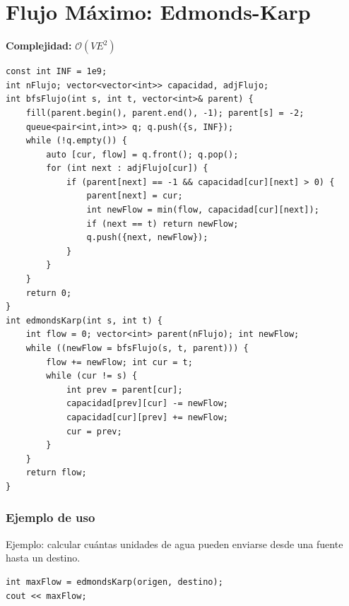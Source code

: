 \documentclass[10pt,twocolumn,letterpaper]{report}
\begin{document}
\section{Flujo Máximo: Edmonds-Karp}
\textbf{Complejidad:} $\mathcal{O}(V E^2)$
\begin{lstlisting}
const int INF = 1e9;
int nFlujo; vector<vector<int>> capacidad, adjFlujo;
int bfsFlujo(int s, int t, vector<int>& parent) {
    fill(parent.begin(), parent.end(), -1); parent[s] = -2;
    queue<pair<int,int>> q; q.push({s, INF});
    while (!q.empty()) {
        auto [cur, flow] = q.front(); q.pop();
        for (int next : adjFlujo[cur]) {
            if (parent[next] == -1 && capacidad[cur][next] > 0) {
                parent[next] = cur;
                int newFlow = min(flow, capacidad[cur][next]);
                if (next == t) return newFlow;
                q.push({next, newFlow});
            }
        }
    }
    return 0;
}
int edmondsKarp(int s, int t) {
    int flow = 0; vector<int> parent(nFlujo); int newFlow;
    while ((newFlow = bfsFlujo(s, t, parent))) {
        flow += newFlow; int cur = t;
        while (cur != s) {
            int prev = parent[cur];
            capacidad[prev][cur] -= newFlow;
            capacidad[cur][prev] += newFlow;
            cur = prev;
        }
    }
    return flow;
}
\end{lstlisting}
\subsubsection*{Ejemplo de uso}
Ejemplo: calcular cuántas unidades de agua pueden enviarse desde una fuente hasta un destino.
\begin{lstlisting}
int maxFlow = edmondsKarp(origen, destino);
cout << maxFlow;
\end{lstlisting}


\end{document}
